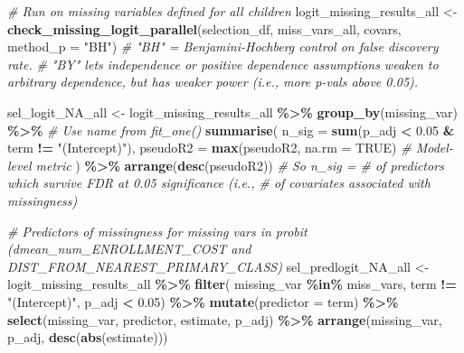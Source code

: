\documentclass[
]{article}
\newenvironment{Shaded}{\begin{snugshade}}{\end{snugshade}}
\newcommand{\AttributeTok}[1]{\textcolor[rgb]{0.13,0.29,0.53}{#1}}
\newcommand{\CommentTok}[1]{\textcolor[rgb]{0.56,0.35,0.01}{\textit{#1}}}
\newcommand{\ConstantTok}[1]{\textcolor[rgb]{0.56,0.35,0.01}{#1}}
\newcommand{\FloatTok}[1]{\textcolor[rgb]{0.00,0.00,0.81}{#1}}
\newcommand{\FunctionTok}[1]{\textcolor[rgb]{0.13,0.29,0.53}{\textbf{#1}}}
\newcommand{\NormalTok}[1]{#1}
\newcommand{\OtherTok}[1]{\textcolor[rgb]{0.56,0.35,0.01}{#1}}
\newcommand{\SpecialCharTok}[1]{\textcolor[rgb]{0.81,0.36,0.00}{\textbf{#1}}}
\newcommand{\StringTok}[1]{\textcolor[rgb]{0.31,0.60,0.02}{#1}}
\begin{document}
\begin{Shaded}
\begin{Highlighting}[]
\CommentTok{\# Run on missing variables defined for all children}
\NormalTok{logit\_missing\_results\_all }\OtherTok{\textless{}{-}} \FunctionTok{check\_missing\_logit\_parallel}\NormalTok{(selection\_df, miss\_vars\_all, covars, }\AttributeTok{method\_p =} \StringTok{"BH"}\NormalTok{) }\CommentTok{\# "BH" = Benjamini{-}Hochberg control on false discovery rate. }
\CommentTok{\# "BY" lets independence or positive dependence assumptions weaken to arbitrary dependence, but has weaker power (i.e., more p{-}vals above 0.05).}

\NormalTok{sel\_logit\_NA\_all }\OtherTok{\textless{}{-}}\NormalTok{ logit\_missing\_results\_all }\SpecialCharTok{\%\textgreater{}\%}
  \FunctionTok{group\_by}\NormalTok{(missing\_var) }\SpecialCharTok{\%\textgreater{}\%} \CommentTok{\# Use name from fit\_one()}
  \FunctionTok{summarise}\NormalTok{(}
    \AttributeTok{n\_sig =} \FunctionTok{sum}\NormalTok{(p\_adj }\SpecialCharTok{\textless{}} \FloatTok{0.05} \SpecialCharTok{\&}\NormalTok{ term }\SpecialCharTok{!=} \StringTok{"(Intercept)"}\NormalTok{),}
    \AttributeTok{pseudoR2 =} \FunctionTok{max}\NormalTok{(pseudoR2, }\AttributeTok{na.rm =} \ConstantTok{TRUE}\NormalTok{) }\CommentTok{\# Model{-}level metric}
\NormalTok{  ) }\SpecialCharTok{\%\textgreater{}\%}
  \FunctionTok{arrange}\NormalTok{(}\FunctionTok{desc}\NormalTok{(pseudoR2))}
\CommentTok{\# So n\_sig = \# of predictors which survive FDR at 0.05 significance (i.e., \# of covariates associated with missingness)}

\CommentTok{\# Predictors of missingness for missing vars in probit (dmean\_num\_ENROLLMENT\_COST and DIST\_FROM\_NEAREST\_PRIMARY\_CLASS)}
\NormalTok{sel\_predlogit\_NA\_all }\OtherTok{\textless{}{-}}\NormalTok{ logit\_missing\_results\_all }\SpecialCharTok{\%\textgreater{}\%} 
  \FunctionTok{filter}\NormalTok{(}
\NormalTok{    missing\_var }\SpecialCharTok{\%in\%}\NormalTok{ miss\_vars,}
\NormalTok{    term }\SpecialCharTok{!=} \StringTok{"(Intercept)"}\NormalTok{,}
\NormalTok{    p\_adj }\SpecialCharTok{\textless{}} \FloatTok{0.05}\NormalTok{) }\SpecialCharTok{\%\textgreater{}\%} 
  \FunctionTok{mutate}\NormalTok{(}\AttributeTok{predictor =}\NormalTok{ term) }\SpecialCharTok{\%\textgreater{}\%}
  \FunctionTok{select}\NormalTok{(missing\_var, predictor, estimate, p\_adj) }\SpecialCharTok{\%\textgreater{}\%} 
  \FunctionTok{arrange}\NormalTok{(missing\_var, p\_adj, }\FunctionTok{desc}\NormalTok{(}\FunctionTok{abs}\NormalTok{(estimate)))}


\end{Highlighting}
\end{Shaded}
\end{document}
